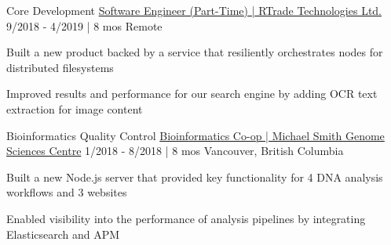 \begin{cventries}
  \cventry
    {Core Development} %
    {\href{https://bobheadxi.dev/experience/rtrade}{Software Engineer (Part-Time) | RTrade Technologies Ltd.}} %
    {9/2018 - 4/2019 | 8 mos} %
    {Remote} %
    {
      \begin{cvitems} %
        \item {Built a new product backed by a service that resiliently orchestrates nodes for distributed filesystems}
        \item {Improved results and performance for our search engine by adding OCR text extraction for image content}
      \end{cvitems}
    }

  \cventry
    {Bioinformatics Quality Control} %
    {\href{https://bobheadxi.dev/experience/bcgsc}{Bioinformatics Co-op | Michael Smith Genome Sciences Centre}} %
    {1/2018 - 8/2018 | 8 mos} %
    {Vancouver, British Columbia} %
    {
      \begin{cvitems} %
        \item {Built a new Node.js server that provided key functionality for 4 DNA analysis workflows and 3 websites}
        \item {Enabled visibility into the performance of analysis pipelines by integrating Elasticsearch and APM}
      \end{cvitems}
    }

\end{cventries}
